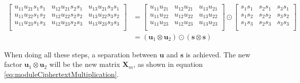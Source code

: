 \begin{align*}
  \begin{bmatrix}
    u_{11}u_{21}s_{1}s_{1} & u_{12}u_{21}s_{2}s_{1} & u_{13}u_{21}s_{3}s_{1} \\
    u_{11}u_{22}s_{1}s_{2} & u_{12}u_{22}s_{2}s_{2} & u_{13}u_{22}s_{3}s_{2} \\
    u_{11}u_{23}s_{1}s_{3} & u_{12}u_{23}s_{2}s_{3} & u_{13}u_{23}s_{3}s_{3} \\
  \end{bmatrix}
   & = \begin{bmatrix}
         u_{11}u_{21} & u_{12}u_{21} & u_{13}u_{21} \\
         u_{11}u_{22} & u_{12}u_{22} & u_{13}u_{22} \\
         u_{11}u_{23} & u_{12}u_{23} & u_{13}u_{23} \\
       \end{bmatrix} \odot \begin{bmatrix}
                             s_{1}s_{1} & s_{2}s_{1} & s_{3}s_{1} \\
                             s_{1}s_{2} & s_{2}s_{2} & s_{3}s_{2} \\
                             s_{1}s_{3} & s_{2}s_{3} & s_{3}s_{3} \\
                           \end{bmatrix}                \\
   & = (\textbf{u}_1 \otimes \textbf{u}_2) \odot (\textbf{s} \otimes \textbf{s} )
\end{align*}

When doing all these steps, a separation between $\textbf{u}$ and $\textbf{s}$ is achieved. The new factor $\textbf{u}_1 \otimes \textbf{u}_2$ will be the new matrix $\textbf{X}_m$, as shown in equation \ref{eq:moduleCiphertextMultiplication}.

